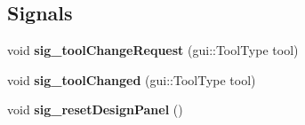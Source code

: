 \subsection*{Signals}
\begin{DoxyCompactItemize}
\item 
void {\bfseries sig\+\_\+tool\+Change\+Request} (gui\+::\+Tool\+Type tool)\hypertarget{classgui_1_1DesignPanel_a8015b37634a7843a1e89b4f1a4577f0d}{}\label{classgui_1_1DesignPanel_a8015b37634a7843a1e89b4f1a4577f0d}

\item 
void {\bfseries sig\+\_\+tool\+Changed} (gui\+::\+Tool\+Type tool)\hypertarget{classgui_1_1DesignPanel_a9f7141de8ef9dc33a77286b362d1f5a0}{}\label{classgui_1_1DesignPanel_a9f7141de8ef9dc33a77286b362d1f5a0}

\item 
void {\bfseries sig\+\_\+reset\+Design\+Panel} ()\hypertarget{classgui_1_1DesignPanel_a54fdb522cee90de6f2faeabcc723e242}{}\label{classgui_1_1DesignPanel_a54fdb522cee90de6f2faeabcc723e242}

\end{DoxyCompactItemize}
